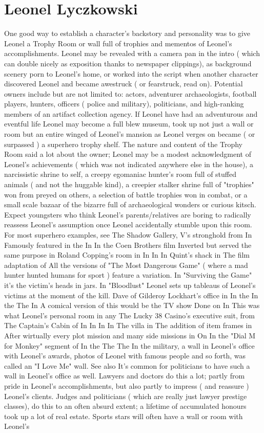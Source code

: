 \documentclass[12pt]{book}
\begin{document}
\chapter{Leonel Lyczkowski}

One good way to establish a character's backstory and personality was to give Leonel a Trophy Room or wall full of trophies and mementos of Leonel's accomplishments. Leonel may be revealed with a camera pan in the intro ( which can double nicely as exposition thanks to newspaper clippings), as background scenery porn to Leonel's home, or worked into the script when another character discovered Leonel and became awestruck ( or fearstruck, read on). Potential owners include but are not limited to: actors, adventurer archaeologists, football players, hunters, officers ( police and military), politicians, and high-ranking members of an artifact collection agency. If Leonel have had an adventurous and eventful life Leonel may become a full blew museum, took up not just a wall or room but an entire winged of Leonel's mansion as Leonel verges on became ( or surpassed ) a superhero trophy shelf. The nature and content of the Trophy Room said a lot about the owner; Leonel may be a modest acknowledgment of Leonel's achievements ( which was not indicated anywhere else in the house), a narcissistic shrine to self, a creepy egomaniac hunter's room full of stuffed animals ( and not the huggable kind), a creepier stalker shrine full of "trophies" won from preyed on others, a selection of battle trophies won in combat, or a small scale bazaar of the bizarre full of archaeological wonders or curious kitsch. Expect youngsters who think Leonel's parents/relatives are boring to radically reassess Leonel's assumption once Leonel accidentally stumble upon this room. For most superhero examples, see The Shadow Gallery, V's stronghold from In Famously featured in the In In the Coen Brothers film Inverted but served the same purpose in Roland Copping's room in In In In Quint's shack in The film adaptation of All the versions of "The Most Dangerous Game" ( where a mad hunter hunted humans for sport ) feature a variation. In "Surviving the Game" it's the victim's heads in jars. In "Bloodlust" Leonel sets up tableaus of Leonel's victims at the moment of the kill. Dave of Gilderoy Lockhart's office in In the In the The In A comical version of this would be the TV show Done on In This was what Leonel's personal room in any The Lucky 38 Casino's executive suit, from The Captain's Cabin of In In In In The villa in The addition of item frames in After wirtually every plot mission and many side missions in On In the "Dial M for Monkey" segment of In the The The In the military, a wall in Leonel's office with Leonel's awards, photos of Leonel with famous people and so forth, was called an "I Love Me" wall. See also It's common for politicians to have such a wall in Leonel's office as well. Lawyers and doctors do this a lot; partly from pride in Leonel's accomplishments, but also partly to impress ( and reassure ) Leonel's clients. Judges and politicians ( which are really just lawyer prestige classes), do this to an often absurd extent; a lifetime of accumulated honours took up a lot of real estate. Sports stars will often have a wall or room with Leonel's 
\end{document}
